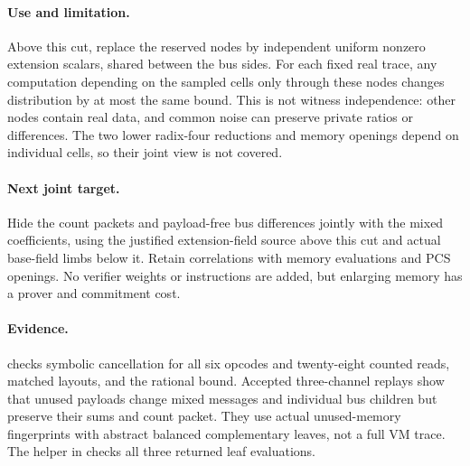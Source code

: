 \paragraph{Use and limitation.} Above this cut, replace the reserved nodes by independent uniform nonzero extension scalars, shared between the bus sides. For each fixed real trace, any computation depending on the sampled cells only through these nodes changes distribution by at most the same bound. This is not witness independence: other nodes contain real data, and common noise can preserve private ratios or differences. The two lower radix-four reductions and memory openings depend on individual cells, so their joint view is not covered.

\paragraph{Next joint target.} Hide the count packets and payload-free bus differences jointly with the mixed coefficients, using the justified extension-field source above this cut and actual base-field limbs below it. Retain correlations with memory evaluations and PCS openings. No verifier weights or instructions are added, but enlarging memory has a prover and commitment cost.

\paragraph{Evidence.}  checks symbolic cancellation for all six opcodes and twenty-eight counted reads, matched layouts, and the rational bound. Accepted three-channel replays show that unused payloads change mixed messages and individual bus children but preserve their sums and count packet. They use actual unused-memory fingerprints with abstract balanced complementary leaves, not a full VM trace. The helper in  checks all three returned leaf evaluations.

